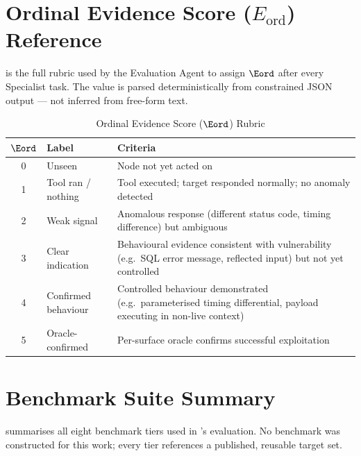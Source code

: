 \section{Ordinal Evidence Score ($E_{\mathrm{ord}}$) Reference}
\label{app:eord}

 is the full rubric used by the Evaluation Agent to assign $\Eord$ after every Specialist task. The value is parsed deterministically from constrained JSON output — not inferred from free-form text.

\begin{table}[h!]
  \centering
  \caption{Ordinal Evidence Score ($\Eord$) Rubric}\label{tab:eord}
  \begin{tabular}{clp{8cm}}
    \hline
    \textbf{$\Eord$} & \textbf{Label} & \textbf{Criteria} \\
    \hline
    0 & Unseen               & Node not yet acted on \\
    1 & Tool ran / nothing   & Tool executed; target responded normally; no anomaly detected \\
    2 & Weak signal          & Anomalous response (different status code, timing difference) but ambiguous \\
    3 & Clear indication     & Behavioural evidence consistent with vulnerability (e.g.\ SQL error message, reflected input) but not yet controlled \\
    4 & Confirmed behaviour  & Controlled behaviour demonstrated (e.g.\ parameterised timing differential, payload executing in non-live context) \\
    5 & Oracle-confirmed     & Per-surface oracle confirms successful exploitation \\
    \hline
  \end{tabular}
\end{table}

\section{Benchmark Suite Summary}
\label{app:benchmarks}

 summarises all eight benchmark tiers used in \redgrid{}'s evaluation. No benchmark was constructed for this work; every tier references a published, reusable target set.

